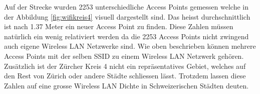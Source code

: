 Auf der Strecke wurden 2253 unterschiedliche Access Points gemessen welche in der Abbildung \ref{fig:wifikreis4} visuell dargestellt sind. Das heisst durchschnittlich ist nach 1.37 Meter ein neuer Access Point zu finden. Diese Zahlen müssen natürlich ein wenig relativiert werden da die 2253 Access Points nicht zwingend auch eigene Wireless LAN Netzwerke sind. Wie oben beschrieben können mehrere Access Points mit der selben SSID zu einem Wireless LAN Netzwerk gehören. Zusätzlich ist der Zürcher Kreis 4 nicht ein repräsentatives Gebiet, welches auf den Rest von Zürich oder andere Städte schliessen lässt. Trotzdem lassen diese Zahlen auf eine grosse Wireless LAN Dichte in Schweizerischen Städten deuten.


